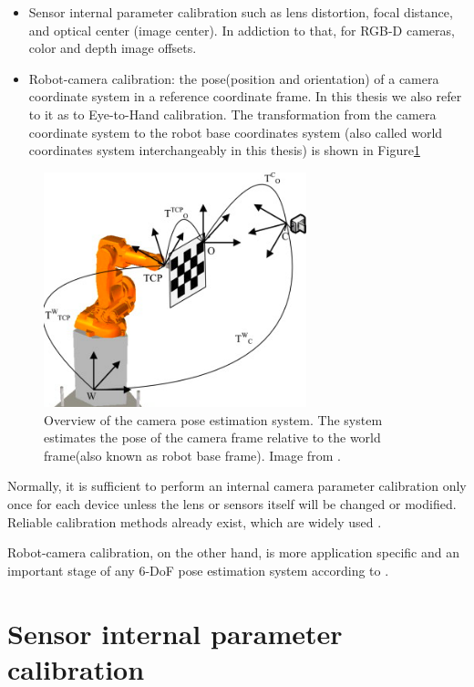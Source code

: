 \begin{itemize}
\item Sensor internal parameter calibration such as lens distortion, focal distance, and optical center (image center). In addiction to that, for RGB-D cameras, color and depth image offsets.
\item Robot-camera calibration: the pose(position and orientation) of a camera coordinate system in a reference coordinate frame. In this thesis we also refer to it as to Eye-to-Hand calibration. The transformation from the camera coordinate system to the robot base coordinates system (also called world coordinates system interchangeably in this thesis) is shown in Figure\ref{fig:system0} 

\end{itemize}
\begin{figure}[!h]
\begin{center}
\includegraphics[width=3in]{figures03/system1.png}
\caption{Overview of the camera pose estimation system. The system estimates  the pose of the camera frame relative to the world frame(also known as robot base frame). Image from \cite{autCAL}.}
\label{fig:system0}
\end{center}
\end{figure}

Normally, it is sufficient to perform an internal camera parameter calibration only once for each device unless the lens or sensors itself will be changed or modified. Reliable calibration methods already exist, which are widely used \cite{Zhang} \cite{Tsai}.

Robot-camera calibration, on the other hand, is more application specific and an important stage of any 6-DoF pose estimation system according to \cite{autCAL1} \cite{autCAL2}. 

\section{Sensor internal parameter calibration}

